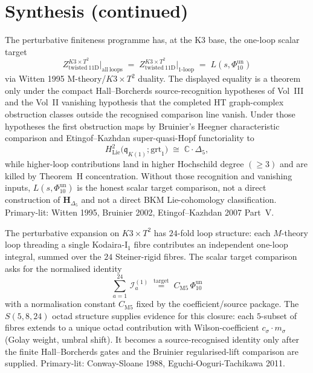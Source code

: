 \section{Synthesis (continued)}
\label{sec:pf-deep}

\begin{remark}
\label{rem:pf-deep-1}
The perturbative finiteness programme has, at the K3 base, the
one-loop scalar target
\[
Z_{\mathrm{twisted\ 11D}}^{K3\times T^2}\big|_{\mathrm{all\ loops}} \;=\; Z_{\mathrm{twisted\ 11D}}^{K3\times T^2}\big|_{\mathrm{1\text{-}loop}} \;=\; L(s,\Phi_{10}^{\mathrm{un}})
\]
via Witten 1995 M-theory/$K3\times T^2$ duality.  The displayed
equality is a theorem only under the compact Hall--Borcherds
source-recognition hypotheses of Vol~III and the Vol~II vanishing
hypothesis that the completed HT graph-complex obstruction classes
outside the recognised comparison line vanish.  Under those hypotheses
the first obstruction maps by Bruinier's Heegner characteristic
comparison and Etingof--Kazhdan super-quasi-Hopf functoriality to
\[
H^2_{\mathrm{Lie}}\bigl(\mathfrak q_{K(1)};\mathrm{grt}_1\bigr)
\;\cong\; \mathbb C\cdot\Delta_5,
\]
while higher-loop contributions land in higher Hochschild degree
$(\ge 3)$ and are killed by Theorem~H concentration.  Without those
recognition and vanishing inputs, $L(s,\Phi_{10}^{\mathrm{un}})$ is the
honest scalar target comparison, not a direct construction of
$\mathbf H_{\Delta_5}$ and not a direct BKM Lie-cohomology
classification.  Primary-lit: Witten 1995, Bruinier 2002,
Etingof--Kazhdan 2007 Part~V.
\end{remark}

\begin{remark}
\label{rem:pf-deep-2}
The perturbative expansion on $K3\times T^2$ has $24$-fold loop
structure: each $M$-theory loop threading a single Kodaira-I$_1$ fibre
contributes an independent one-loop integral, summed over the $24$
Steiner-rigid fibres. The scalar target comparison asks for the
normalised identity
\[
\sum_{a=1}^{24}\, \mathcal I^{(1)}_a
\;\stackrel{\mathrm{target}}{=}\;
C_{\mathrm{M5}}\,\Phi_{10}^{\mathrm{un}}
\]
with a normalisation constant $C_{\mathrm{M5}}$ fixed by the
coefficient/source package. The $S(5,8,24)$ octad structure supplies
evidence for this closure: each $5$-subset of fibres extends to a
unique octad contribution with Wilson-coefficient
$c_\sigma\cdot m_\sigma$ (Golay weight, umbral shift). It becomes a
source-recognised identity only after the finite Hall--Borcherds gates
and the Bruinier regularised-lift comparison are supplied. Primary-lit:
Conway-Sloane 1988, Eguchi-Ooguri-Tachikawa 2011.
\end{remark}
